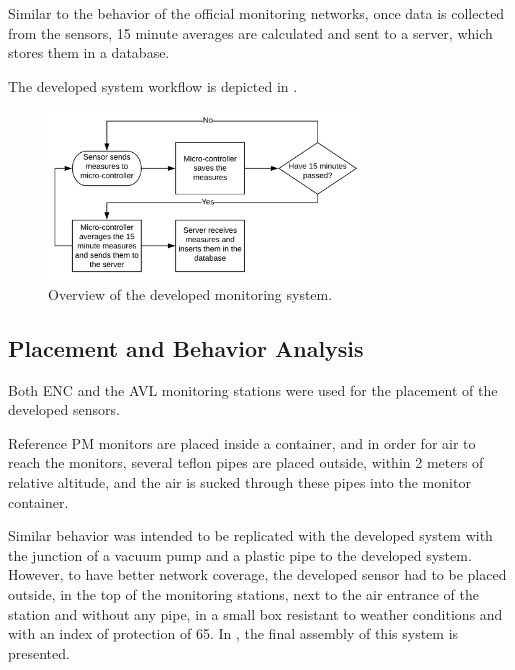 Similar to the behavior of the official monitoring networks, once data is collected from the sensors, 15 minute averages are calculated and sent to a server, which stores them in a database.

The developed system workflow is depicted in .

\begin{figure}[ht]
\centering
\includegraphics[width=0.75\textwidth]{./Images/flowchart_monitoring_system.png}
\caption{Overview of the developed monitoring system.}
\label{fig:flowchart_monitoring_system}
\end{figure}

\subsection{Placement and Behavior Analysis}

Both \ac{ENC} and the \ac{AVL} monitoring stations were used for the placement of the developed sensors.

Reference PM monitors are placed inside a container, and in order for air to reach the monitors, several teflon pipes are placed outside, within 2 meters of relative altitude, and the air is sucked through these pipes into the monitor container.

Similar behavior was intended to be replicated with the developed system with the junction of a vacuum pump and a plastic pipe to the developed system. However, to have better network coverage, the developed sensor had to be placed outside, in the top of the monitoring stations, next to the air entrance of the station and without any pipe, in a small box resistant to weather conditions and with an index of protection of 65. In , the final assembly of this system is presented.

